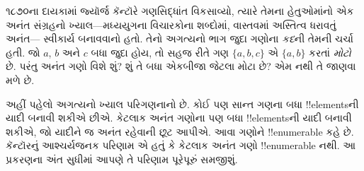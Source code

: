 \documentclass[../../../include/open-logic-section]{subfiles}
\begin{document}


૧૮૭૦ના દાયકામાં જ્યૉર્જ કૅન્ટૉરે ગણસિદ્ધાંત વિકસાવ્યો,
ત્યારે તેમના હેતુઓમાંનો એક અનંત સંગ્રહનો ખ્યાલ---મધ્યયુગના
વિચારકોના શબ્દોમાં, વાસ્તવમાં અસ્તિત્વ ધરાવતું અનંત---
સ્વીકાર્ય બનાવવાનો હતો. તેનો અગત્યનો ભાગ જુદા ગણોના
\emph{કદ}ની તેમની ચર્ચા હતી. જો $a$, $b$ અને $c$
બધા જુદા હોય, તો સહજ રીતે ગણ $\{a, b, c\}$ એ
$\{a, b\}$ કરતાં \emph{મોટો} છે. પરંતુ અનંત ગણો વિશે
શું? શું તે બધા એકબીજા જેટલા મોટા છે? એમ નથી તે જાણવા મળે છે.

અહીં પહેલો અગત્યનો ખ્યાલ પરિગણનાનો છે. કોઈ પણ સાન્ત
ગણના બધા !!{element}sની યાદી બનાવી શકીએ છીએ.
કેટલાક અનંત ગણોના પણ બધા !!{element}sની યાદી બનાવી
શકીએ, જો યાદીને જ અનંત રહેવાની છૂટ આપીએ.
આવા ગણોને !!{enumerable} કહે છે. કૅન્ટૉરનું આશ્ચર્યજનક
પરિણામ એ હતું કે કેટલાક અનંત ગણો !!{enumerable} નથી.
આ પ્રકરણના અંત સુધીમાં આપણે તે પરિણામ પૂરેપૂરું સમજીશું.
\end{document}
